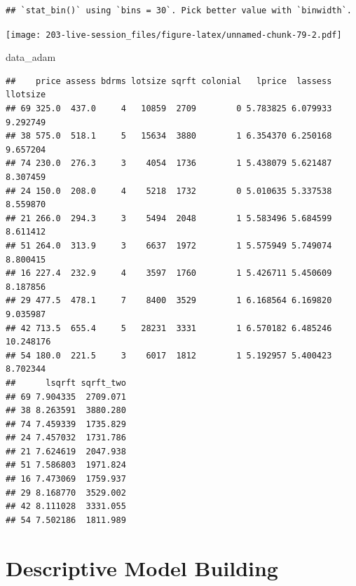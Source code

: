 \documentclass[
]{book}
\newenvironment{Shaded}{\begin{snugshade}}{\end{snugshade}}
\newcommand{\NormalTok}[1]{#1}
\theoremstyle{definition}
\theoremstyle{definition}
\theoremstyle{definition}
\theoremstyle{definition}
\theoremstyle{remark}
\begin{document}
\begin{verbatim}
## `stat_bin()` using `bins = 30`. Pick better value with `binwidth`.
\end{verbatim}

\texttt{[image: 203-live-session\_files/figure-latex/unnamed-chunk-79-2.pdf]}

\begin{Shaded}
\begin{Highlighting}[]
\NormalTok{data\_adam}
\end{Highlighting}
\end{Shaded}

\begin{verbatim}
##    price assess bdrms lotsize sqrft colonial   lprice  lassess  llotsize
## 69 325.0  437.0     4   10859  2709        0 5.783825 6.079933  9.292749
## 38 575.0  518.1     5   15634  3880        1 6.354370 6.250168  9.657204
## 74 230.0  276.3     3    4054  1736        1 5.438079 5.621487  8.307459
## 24 150.0  208.0     4    5218  1732        0 5.010635 5.337538  8.559870
## 21 266.0  294.3     3    5494  2048        1 5.583496 5.684599  8.611412
## 51 264.0  313.9     3    6637  1972        1 5.575949 5.749074  8.800415
## 16 227.4  232.9     4    3597  1760        1 5.426711 5.450609  8.187856
## 29 477.5  478.1     7    8400  3529        1 6.168564 6.169820  9.035987
## 42 713.5  655.4     5   28231  3331        1 6.570182 6.485246 10.248176
## 54 180.0  221.5     3    6017  1812        1 5.192957 5.400423  8.702344
##      lsqrft sqrft_two
## 69 7.904335  2709.071
## 38 8.263591  3880.280
## 74 7.459339  1735.829
## 24 7.457032  1731.786
## 21 7.624619  2047.938
## 51 7.586803  1971.824
## 16 7.473069  1759.937
## 29 8.168770  3529.002
## 42 8.111028  3331.055
## 54 7.502186  1811.989
\end{verbatim}

\hypertarget{descriptive-model-building}{%
\chapter{Descriptive Model Building}\label{descriptive-model-building}}
\end{document}
